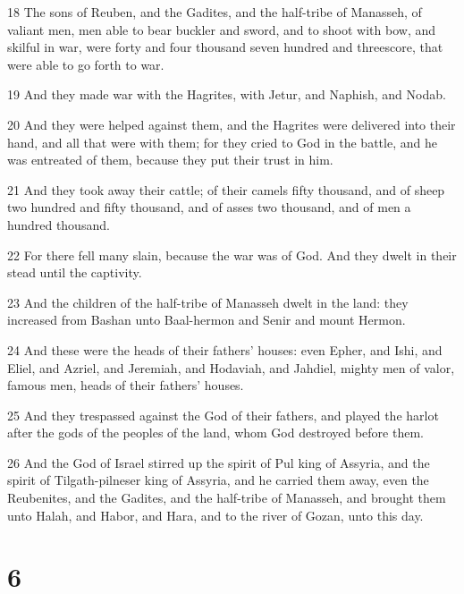 \par 18 The sons of Reuben, and the Gadites, and the half-tribe of Manasseh, of valiant men, men able to bear buckler and sword, and to shoot with bow, and skilful in war, were forty and four thousand seven hundred and threescore, that were able to go forth to war.
\par 19 And they made war with the Hagrites, with Jetur, and Naphish, and Nodab.
\par 20 And they were helped against them, and the Hagrites were delivered into their hand, and all that were with them; for they cried to God in the battle, and he was entreated of them, because they put their trust in him.
\par 21 And they took away their cattle; of their camels fifty thousand, and of sheep two hundred and fifty thousand, and of asses two thousand, and of men a hundred thousand.
\par 22 For there fell many slain, because the war was of God. And they dwelt in their stead until the captivity.
\par 23 And the children of the half-tribe of Manasseh dwelt in the land: they increased from Bashan unto Baal-hermon and Senir and mount Hermon.
\par 24 And these were the heads of their fathers' houses: even Epher, and Ishi, and Eliel, and Azriel, and Jeremiah, and Hodaviah, and Jahdiel, mighty men of valor, famous men, heads of their fathers' houses.
\par 25 And they trespassed against the God of their fathers, and played the harlot after the gods of the peoples of the land, whom God destroyed before them.
\par 26 And the God of Israel stirred up the spirit of Pul king of Assyria, and the spirit of Tilgath-pilneser king of Assyria, and he carried them away, even the Reubenites, and the Gadites, and the half-tribe of Manasseh, and brought them unto Halah, and Habor, and Hara, and to the river of Gozan, unto this day.

\chapter{6}


